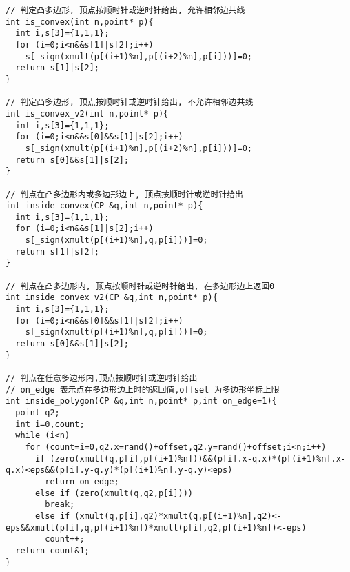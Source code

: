 \begin{lstlisting}[language={}]
// 判定凸多边形, 顶点按顺时针或逆时针给出, 允许相邻边共线
int is_convex(int n,point* p){
  int i,s[3]={1,1,1};
  for (i=0;i<n&&s[1]|s[2];i++)
    s[_sign(xmult(p[(i+1)%n],p[(i+2)%n],p[i]))]=0;
  return s[1]|s[2];
}

// 判定凸多边形, 顶点按顺时针或逆时针给出, 不允许相邻边共线
int is_convex_v2(int n,point* p){
  int i,s[3]={1,1,1};
  for (i=0;i<n&&s[0]&&s[1]|s[2];i++)
    s[_sign(xmult(p[(i+1)%n],p[(i+2)%n],p[i]))]=0;
  return s[0]&&s[1]|s[2];
}                                   

// 判点在凸多边形内或多边形边上, 顶点按顺时针或逆时针给出
int inside_convex(CP &q,int n,point* p){
  int i,s[3]={1,1,1};
  for (i=0;i<n&&s[1]|s[2];i++)
    s[_sign(xmult(p[(i+1)%n],q,p[i]))]=0;
  return s[1]|s[2];
}

// 判点在凸多边形内, 顶点按顺时针或逆时针给出, 在多边形边上返回0
int inside_convex_v2(CP &q,int n,point* p){
  int i,s[3]={1,1,1};
  for (i=0;i<n&&s[0]&&s[1]|s[2];i++)
    s[_sign(xmult(p[(i+1)%n],q,p[i]))]=0;
  return s[0]&&s[1]|s[2];
}

// 判点在任意多边形内,顶点按顺时针或逆时针给出
// on_edge 表示点在多边形边上时的返回值,offset 为多边形坐标上限
int inside_polygon(CP &q,int n,point* p,int on_edge=1){
  point q2;
  int i=0,count;
  while (i<n)
    for (count=i=0,q2.x=rand()+offset,q2.y=rand()+offset;i<n;i++)
      if (zero(xmult(q,p[i],p[(i+1)%n]))&&(p[i].x-q.x)*(p[(i+1)%n].x-q.x)<eps&&(p[i].y-q.y)*(p[(i+1)%n].y-q.y)<eps)
        return on_edge;
      else if (zero(xmult(q,q2,p[i])))
        break;
      else if (xmult(q,p[i],q2)*xmult(q,p[(i+1)%n],q2)<-eps&&xmult(p[i],q,p[(i+1)%n])*xmult(p[i],q2,p[(i+1)%n])<-eps)
        count++;
  return count&1;
}


\end{lstlisting}
